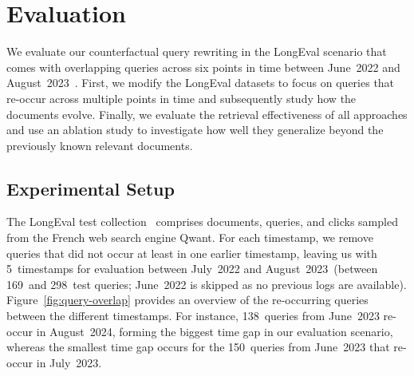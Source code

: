 \section{Evaluation}

We evaluate our counterfactual query rewriting in the LongEval scenario that comes with overlapping queries across six points in time between June~2022 and August~2023~\cite{alkhalifa:2023,alkhalifa:2024,galuscakova:2023}. First, we modify the LongEval datasets to focus on queries that re-occur across multiple points in time and subsequently study how the documents evolve. Finally, we evaluate the retrieval effectiveness of all approaches and use an ablation study to investigate how well they generalize beyond the previously known relevant documents.

\subsection{Experimental Setup}



The LongEval test collection~\cite{galuscakova:2023} comprises documents, queries, and clicks sampled from the French web search engine Qwant. For each timestamp, we remove queries that did not occur at least in one earlier timestamp, leaving us with 5~timestamps for evaluation between July~2022 and August~2023~(between 169~and 298~test queries; June~2022 is skipped as no previous logs are available). Figure~\ref{fig:query-overlap} provides an overview of the re-occurring queries between the different timestamps. For instance, 138~queries from June~2023 re-occur in August~2024, forming the biggest time gap in our evaluation scenario, whereas the smallest time gap occurs for the 150~queries from June~2023 that re-occur in July~2023.

